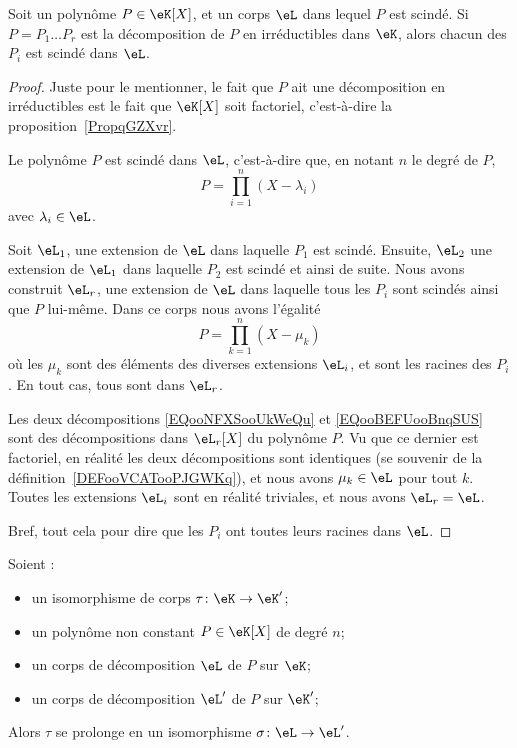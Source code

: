 \begin{lemma}        \label{LEMooJNGWooTXdGre}
    Soit un polynôme \( P\in \eK[X]\), et un corps \( \eL\) dans lequel \( P\) est scindé. Si \( P=P_1\ldots P_r\) est la décomposition de \( P\) en irréductibles dans \( \eK\), alors chacun des \( P_i\) est scindé dans \( \eL\).
\end{lemma}

\begin{proof}
    Juste pour le mentionner, le fait que \( P\) ait une décomposition en irréductibles est le fait que \( \eK[X]\) soit factoriel, c'est-à-dire la proposition~\ref{PropqGZXvr}.

    Le polynôme \( P\) est scindé dans \( \eL\), c'est-à-dire que, en notant \( n\) le degré de \( P\),
    \begin{equation}        \label{EQooNFXSooUkWeQu}
        P=\prod_{i=1}^n(X-\lambda_i)
    \end{equation}
    avec \( \lambda_i\in \eL\).

    Soit \( \eL_1\), une extension de \( \eL\) dans laquelle \( P_1\) est scindé. Ensuite, \( \eL_2\) une extension de \( \eL_1\) dans laquelle \( P_2\) est scindé et ainsi de suite. Nous avons construit \( \eL_r\), une extension de \( \eL\) dans laquelle tous les \( P_i\) sont scindés ainsi que \( P\) lui-même. Dans ce corps nous avons l'égalité
    \begin{equation}        \label{EQooBEFUooBnqSUS}
        P=\prod_{k=1}^n(X-\mu_k)
    \end{equation}
    où les \( \mu_k\) sont des éléments des diverses extensions \( \eL_i\), et sont les racines des \( P_i\). En tout cas, tous sont dans \( \eL_r\).

    Les deux décompositions \eqref{EQooNFXSooUkWeQu} et \eqref{EQooBEFUooBnqSUS} sont des décompositions dans \( \eL_r[X]\) du polynôme \( P\). Vu que ce dernier est factoriel, en réalité les deux décompositions sont identiques (se souvenir de la définition~\ref{DEFooVCATooPJGWKq}), et nous avons \( \mu_k\in \eL\) pour tout \( k\). Toutes les extensions \( \eL_i\) sont en réalité triviales, et nous avons \( \eL_r=\eL\).

    Bref, tout cela pour dire que les \( P_i\) ont toutes leurs racines dans \( \eL\).
\end{proof}

\begin{theorem}      \label{THOooQVKWooZAAYxK}
    Soient :
    \begin{itemize}
        \item un isomorphisme de corps \( \tau\colon \eK\to \eK'\);
        \item un polynôme non constant \( P\in \eK[X]\) de degré $n$;
        \item un corps de décomposition \( \eL\) de \( P\) sur \( \eK\);
        \item un corps de décomposition \( \eL'\) de \( P\) sur \( \eK'\);
    \end{itemize}
    Alors \( \tau\) se prolonge en un isomorphisme \( \sigma\colon \eL\to \eL'\).
\end{theorem}

